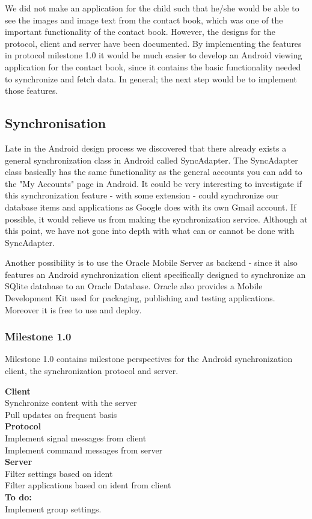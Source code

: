 We did not make an application for the child such that he/she would be able to see the images and image text from the contact book, which was one of the important functionality of the contact book. However, the designs for the protocol, client and server have been documented. By implementing the features in protocol milestone 1.0 it would be much easier to develop an Android viewing application for the contact book, since it contains the basic functionality needed to synchronize and fetch data. In general; the next step would be to implement those features. 

\subsection{Synchronisation}
Late in the Android design process we discovered that there already exists a general synchronization class in Android called SyncAdapter. The SyncAdapter class basically has the same functionality as the general accounts you can add to the "My Accounts" page in Android\cite{AndDevel4}. It could be very interesting to investigate if this synchronization feature - with some extension - could synchronize our database items and applications as Google does with its own Gmail account. If possible, it would relieve us from making the synchronization service. Although at this point, we have not gone into depth with what can or cannot be done with SyncAdapter. 

Another possibility is to use the Oracle Mobile Server as backend - since it also features an Android synchronization client specifically designed to synchronize an SQlite database to an Oracle Database. Oracle also provides a Mobile Development Kit used for packaging, publishing and testing applications. Moreover it is free to use and deploy\cite{Oracle}.  

\subsubsection*{Milestone 1.0}
Milestone 1.0 contains milestone perspectives for the Android synchronization client, the synchronization protocol and server.  

\textbf{Client}\\
Synchronize content with the server\\
Pull updates on frequent basis\\

\textbf{Protocol}\\
Implement signal messages from client\\
Implement command messages from server\\

\textbf{Server}\\
Filter settings based on ident\\
Filter applications based on ident from client\\

\textbf{To do:}\\
Implement group settings.  
